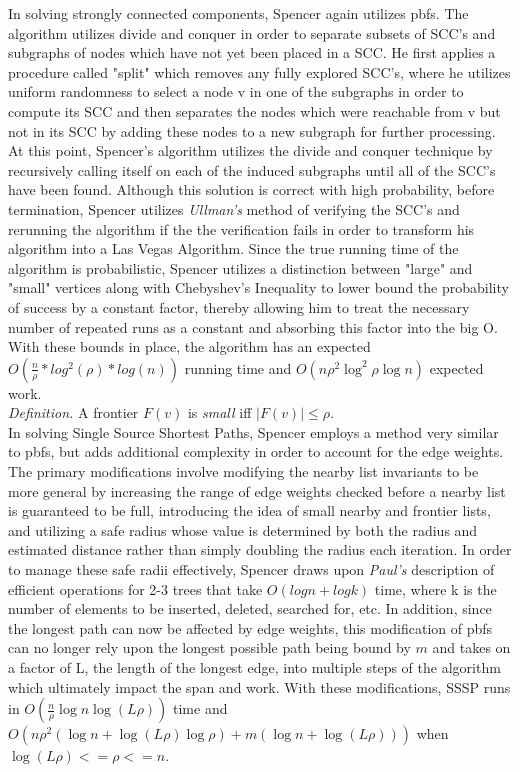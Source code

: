 \documentclass[paper=a4, fontsize=11pt]{scrartcl} %
\numberwithin{equation}{section} %
\numberwithin{figure}{section} %
\numberwithin{table}{section} %
\begin{document}
In solving strongly connected components, Spencer again utilizes pbfs. The algorithm utilizes divide and conquer in order to separate subsets of SCC's and subgraphs of nodes which have not yet been placed in a SCC. He first applies a procedure called "split" which removes any fully explored SCC's, where he utilizes uniform randomness to select a node v in one of the subgraphs in order to compute its SCC and then separates the nodes which were reachable from v but not in its SCC by adding these nodes to a new subgraph for further processing. At this point, Spencer's algorithm utilizes the divide and conquer technique by recursively calling itself on each of the induced subgraphs until all of the SCC's have been found. Although this solution is correct with high probability, before termination, Spencer utilizes \textit{Ullman's\cite{UY91}} method of verifying the SCC's and rerunning the algorithm if the the verification fails in order to transform his algorithm into a Las Vegas Algorithm. Since the true running time of the algorithm is probabilistic, Spencer utilizes a distinction between "large" and "small" vertices along with Chebyshev's Inequality to lower bound the probability of success by a constant factor, thereby allowing him to treat the necessary number of repeated runs as a constant and absorbing this factor into the big O. With these bounds in place, the algorithm has an expected $O(\frac{n}{\rho}*log^2(\rho)*log(n))$ running time and $O(n\rho^2\log^2{\rho}\log{n})$ expected work.  \\ 

\textit{Definition.} A frontier $F(v)$ is \textit{small} iff $|F(v)|\le\rho$.\\ 

In solving Single Source Shortest Paths, Spencer employs a method very similar to pbfs, but adds additional complexity in order to account for the edge weights. The primary modifications involve modifying the nearby list invariants to be more general by increasing the range of edge weights checked before a nearby list is guaranteed to be full, introducing the idea of small nearby and frontier lists, and utilizing a safe radius whose value is determined by both the radius and estimated distance rather than simply doubling the radius each iteration. In order to manage these safe radii effectively, Spencer draws upon \textit{Paul's\cite{P83}} description of efficient operations for 2-3 trees that take $O(logn+logk)$ time, where k is the number of elements to be inserted, deleted, searched for, etc. In addition, since the longest path can now be affected by edge weights, this modification of pbfs can no longer rely upon the longest possible path being bound by $m$ and takes on a factor of L, the length of the longest edge, into multiple steps of the algorithm which ultimately impact the span and work. With these modifications, SSSP runs in  $O(\frac{n}{\rho}\log{n}\log{(L\rho)})$ time and $O(n\rho^2(\log{n} + \log{(L\rho)}\log{\rho}) + m(\log{n} + \log{(L\rho)}))$ when $\log{(L\rho)} <= \rho <= n$.
\end{document}
